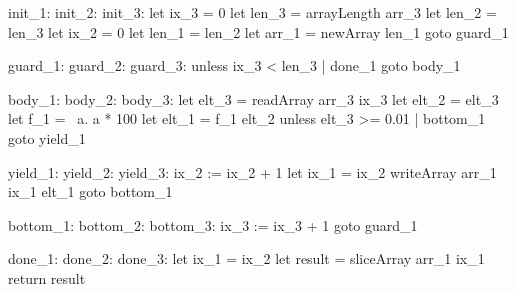 \documentclass[preamble.tex]{subfiles}
\begin{document}
\begin{loopcode}[%
]
init_1:
init_2:
init_3:
  let ix_3 = 0
  let len_3 = arrayLength arr_3
  let len_2 = len_3
  let ix_2 = 0
  let len_1 = len_2
  let arr_1 = newArray len_1
  goto guard_1

guard_1:
guard_2:
guard_3:
  unless ix_3 < len_3 | done_1
  goto body_1

body_1:
body_2:
body_3:
  let elt_3 = readArray arr_3 ix_3
  let elt_2 = elt_3
  let f_1 = \ a. a * 100
  let elt_1 = f_1 elt_2
  unless elt_3 >= 0.01 | bottom_1
  goto yield_1

yield_1:
yield_2:
yield_3:
  ix_2 := ix_2 + 1
  let ix_1 = ix_2
  writeArray arr_1 ix_1 elt_1
  goto bottom_1

bottom_1:
bottom_2:
bottom_3:
  ix_3 := ix_3 + 1
  goto guard_1

done_1:
done_2:
done_3:
  let ix_1 = ix_2
  let result = sliceArray arr_1 ix_1
  return result
\end{loopcode}


\end{document}
